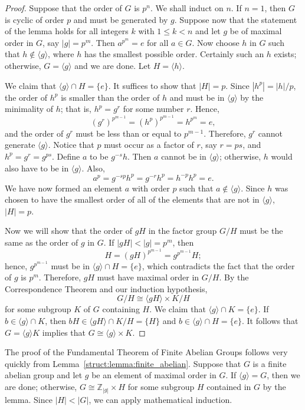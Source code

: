  
\begin{proof}
Suppose that the order of $G$ is $p^n$.  We shall induct on $n$. If
$n= 1$, then $G$ is cyclic of order $p$ and must be generated by $g$.
Suppose now that the statement of the lemma holds for all integers $k$
with $1 \leq k < n$ and let $g$ be of maximal order in $G$, say
$|g| = p^{m}$.  Then $a^{p^m} = e$ for all $a \in G$. Now choose $h$
in $G$ such that $h \notin \langle g \rangle$, where $h$ has the
smallest possible order.  Certainly such an $h$ exists; otherwise, $G
= \langle g \rangle$ and we are done.  Let $H = \langle h \rangle$.
 
 
We claim that $\langle g \rangle \cap H = \{ e \}$. It suffices to
show that $|H|=p$.  Since $|h^p| = |h| / p$, the order of $h^p$ is
smaller than the order of $h$ and must be in $\langle g \rangle$ by
the minimality of $h$; that is, $h^p = g^r$ for some number $r$.
Hence, 
\[
(g^r)^{p^{m-1}} = (h^p)^{p^{m-1}} = h^{p^{m}} = e,
\]
and the order of $g^r$ must be less than or equal to $p^{m-1}$.
Therefore, $g^r$ cannot generate $\langle g \rangle$.  Notice that $p$
must occur as a factor of $r$, say $r = ps$, and $h^p = g^r = g^{ps}$.
Define $a$ to be $g^{-s}h$. Then $a$ cannot be in $\langle g \rangle$;
otherwise, $h$ would also have to be in $\langle g \rangle$. Also, 
\[
a^p = g^{-sp} h^p = g^{-r} h^p = h^{-p} h^p = e.
\]
We have now formed an element $a$ with order $p$ such that $a \notin
\langle g \rangle$. Since $h$ was chosen to have the smallest order of
all of the elements that are not in $\langle g \rangle$, $|H|  = p$.
 
 
Now we will show that the order of $gH$ in the factor group $G/H$ 
must be the same as the order of $g$ in $G$.  If $|gH| < |g| = 
p^m$, then
\[
H = (gH)^{p^{m-1}} =  g^{p^{m-1}} H;
\]
hence, $g^{p^{m-1}}$ must be in $\langle g \rangle \cap H = \{ e \}$,
which contradicts the fact that the order of $g$ is $p^m$.  Therefore,
$gH$ must have maximal order in $G/H$.  By the Correspondence Theorem
and our induction hypothesis,
\[
G/H \cong \langle gH \rangle \times K/H
\]
for some subgroup $K$ of $G$ containing $H$.  We
claim that $\langle g \rangle \cap K = \{ e \}$. If $b \in \langle g
\rangle \cap K$, then $bH \in \langle gH \rangle \cap K/H =  \{ H \}$ and
$b \in \langle g \rangle \cap H = \{ e \}$. It follows that $G =
\langle g \rangle K$ implies that $G \cong \langle g \rangle \times K$. 
\end{proof}
 
\medskip


The proof of the Fundamental Theorem of Finite Abelian Groups follows
very quickly from Lemma~\ref{struct:lemma:finite_abelian}.  Suppose that $G$ is a finite abelian
group and let $g$ be an element of maximal order in $G$. If $\langle g
\rangle = G$, then we are done; otherwise, $G \cong {\mathbb Z}_{|g|}
\times H$ for some subgroup $H$ contained in $G$ by the lemma.  Since
$|H| < |G|$, we can apply mathematical induction.  
 
